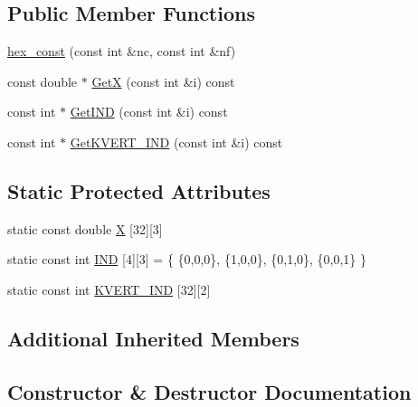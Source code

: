 \subsection*{Public Member Functions}
\begin{DoxyCompactItemize}
\item 
\mbox{\hyperlink{classfemus_1_1hex__const_a4ecdfd871e2006a6f15cd212edb4b559}{hex\+\_\+const}} (const int \&nc, const int \&nf)
\item 
const double $\ast$ \mbox{\hyperlink{classfemus_1_1hex__const_a96b01f930583ac9d99a0a041f82dd0cc}{GetX}} (const int \&i) const
\item 
const int $\ast$ \mbox{\hyperlink{classfemus_1_1hex__const_a8dba97c67c9c993a1eedabfd12aac809}{Get\+I\+ND}} (const int \&i) const
\item 
const int $\ast$ \mbox{\hyperlink{classfemus_1_1hex__const_a085fcb241d0ab952117945bcdd27215b}{Get\+K\+V\+E\+R\+T\+\_\+\+I\+ND}} (const int \&i) const
\end{DoxyCompactItemize}
\subsection*{Static Protected Attributes}
\begin{DoxyCompactItemize}
\item 
static const double \mbox{\hyperlink{classfemus_1_1hex__const_a5c73e5bd6411607a040bca49d6b6cb94}{X}} \mbox{[}32\mbox{]}\mbox{[}3\mbox{]}
\item 
static const int \mbox{\hyperlink{classfemus_1_1hex__const_a991177ba760bc9d5c6213631aebb730e}{I\+ND}} \mbox{[}4\mbox{]}\mbox{[}3\mbox{]} = \{ \{0,0,0\}, \{1,0,0\}, \{0,1,0\}, \{0,0,1\} \}
\item 
static const int \mbox{\hyperlink{classfemus_1_1hex__const_ae083f5d7d582cacc7fc463a0c058b662}{K\+V\+E\+R\+T\+\_\+\+I\+ND}} \mbox{[}32\mbox{]}\mbox{[}2\mbox{]}
\end{DoxyCompactItemize}
\subsection*{Additional Inherited Members}


\subsection{Constructor \& Destructor Documentation}
\mbox{\label{classfemus_1_1hex__const_a4ecdfd871e2006a6f15cd212edb4b559}} 
